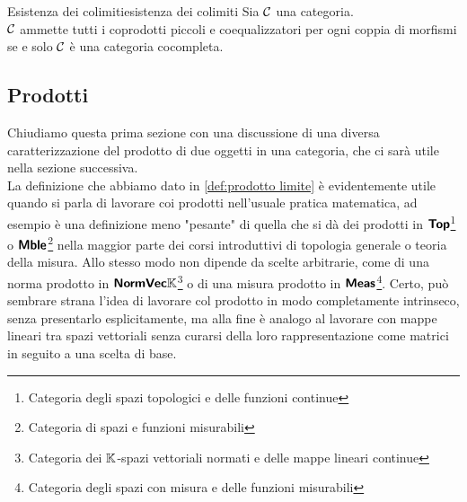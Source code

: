 \documentclass{article}
\renewcommand\C{\mc{C}}
\begin{document}
\begin{corollary}{Esistenza dei colimiti}{esistenza dei colimiti}{
    Sia $\C$ una categoria.\\
    $\C$ ammette tutti i coprodotti piccoli e coequalizzatori per ogni coppia di morfismi se e solo $\C$ è una categoria cocompleta.
}

\subsection{Prodotti}

Chiudiamo questa prima sezione con una discussione di una diversa caratterizzazione del prodotto di due oggetti in una categoria, che ci sarà utile nella sezione successiva.\\
La definizione che abbiamo dato in \ref{def:prodotto limite} è evidentemente utile quando si parla di lavorare coi prodotti nell'usuale pratica matematica, ad esempio è una definizione meno "pesante" di quella che si dà dei prodotti in $\text{\sffamily\textbf{Top}}$\footnote{Categoria degli spazi topologici e delle funzioni continue} o $\text{\sffamily\textbf{Mble}}$\footnote{Categoria di spazi e funzioni misurabili} nella maggior parte dei corsi introduttivi di topologia generale o teoria della misura. Allo stesso modo non dipende da scelte arbitrarie, come di una norma prodotto in $\text{\sffamily\textbf{NormVec}}\mathbb{K}$\footnote{Categoria dei $\mathbb{K}$-spazi vettoriali normati e delle mappe lineari continue} o di una misura prodotto in $\text{\sffamily\textbf{Meas}}$\footnote{Categoria degli spazi con misura e delle funzioni misurabili}. Certo, può sembrare strana l'idea di lavorare col prodotto in modo completamente intrinseco, senza presentarlo esplicitamente, ma alla fine è analogo al lavorare con mappe lineari tra spazi vettoriali senza curarsi della loro rappresentazione come matrici in seguito a una scelta di base.


\end{corollary}
\end{document}
